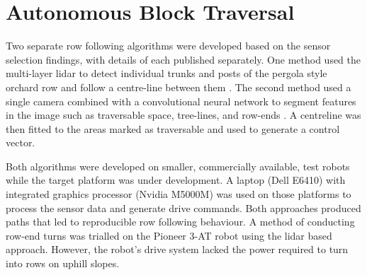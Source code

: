 \documentclass[preprint,authoryear,12pt]{elsarticle}
\begin{document}


\section{Autonomous Block Traversal}
\label{sect:autonomous}
    Two separate row following algorithms were developed based on the sensor selection findings, with details of each published separately.
    One method used the multi-layer lidar to detect individual trunks and posts of the pergola style orchard row and follow a centre-line between them \citep{Bell2016}.
    The second method used a single camera combined with a convolutional neural network to segment features in the image such as traversable space, tree-lines, and row-ends \citep{Bell2017}.
    A centreline was then fitted to the areas marked as traversable and used to generate a control vector.

    Both algorithms were developed on smaller, commercially available, test robots while the target platform was under development.
    A laptop (Dell E6410) with integrated graphics processor (Nvidia M5000M) was used on those platforms to process the sensor data and generate drive commands.
    Both approaches produced paths that led to reproducible row following behaviour.
    A method of conducting row-end turns was trialled on the Pioneer 3-AT robot using the lidar based approach.
    However, the robot's drive system lacked the power required to turn into rows on uphill slopes.
\end{document}
